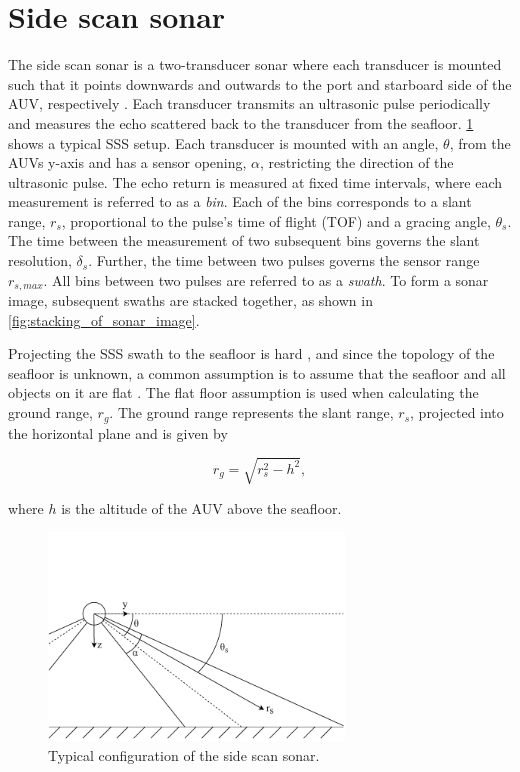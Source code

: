 \section{Side scan sonar}

The side scan sonar is a two-transducer sonar where each transducer is mounted such that it points downwards and outwards to the port and starboard side of the AUV, respectively \cite{Burguera2016High-ResolutionSonar}. Each transducer transmits an ultrasonic pulse periodically and measures the echo scattered back to the transducer from the seafloor. \cref{fig:sss} shows a typical SSS setup. Each transducer is mounted with an angle, $\theta$, from the AUVs y-axis and has a sensor opening, $\alpha$, restricting the direction of the ultrasonic pulse. The echo return is measured at fixed time intervals, where each measurement is referred to as a \textit{bin}. Each of the bins corresponds to a slant range, $r_s$, proportional to the pulse's time of flight (TOF) and a gracing angle, $\theta_s$. The time between the measurement of two subsequent bins governs the slant resolution, $\delta_s$. Further, the time between two pulses governs the sensor range $r_{s, max}$. All bins between two pulses are referred to as a \textit{swath}. To form a sonar image, subsequent swaths are stacked together, as shown in \cref{fig:stacking_of_sonar_image}. 

Projecting the SSS swath to the seafloor is hard \cite{Coiras2007MultiresolutionImages}, and since the topology of the seafloor is unknown, a common assumption is to assume that the seafloor and all objects on it are flat \cite{Burguera2016High-ResolutionSonar, Shin2015BundleMapping}. The flat floor assumption is used when calculating the ground range, $r_g$. The ground range represents the slant range, $r_s$, projected into the horizontal plane and is given by

\begin{equation}
    r_g = \sqrt{r_s^2 - h^2},
    \label{eq:ground_range}
\end{equation}

where $h$ is the altitude of the AUV above the seafloor.

\hspace{1cm}

\begin{figure}[h]
    \centering
    \includegraphics[trim=0cm 0cm 0cm 3.1cm, clip=true, width=0.7\textwidth]{figures/sss.drawio.pdf}
    \caption{Typical configuration of the side scan sonar.}
    \label{fig:sss}
\end{figure}

